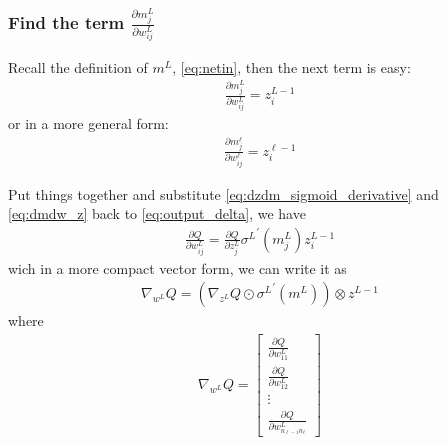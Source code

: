 \documentclass{article} [10pt] %
\begin{document}
\subsubsection{Find the term $\frac{\partial m^L_{j}}{\partial w^L_{ij}}$}
Recall the definition of $m^L$, \eqref{eq:netin}, then the next term is easy:
\begin{align}\label{eq:dmdw_z}
\boxed{
	\frac{\partial m^L_{j}}{\partial w^L_{ij}} = z^{L-1}_i
}
\end{align}
or in a more general form:
\begin{align}\label{eq:dmdw_z}
	\frac{\partial m^\ell_{j}}{\partial w^\ell_{ij}} = z^{\ell-1}_i
\end{align}

Put things together and substitute \eqref{eq:dzdm_sigmoid_derivative}  and \eqref{eq:dmdw_z} back to \eqref{eq:output_delta}, we have
\begin{align}
	\frac{\partial Q}{\partial w^L_{ij}} = \frac{\partial Q}{\partial z^L_{j}}
							{\sigma^L}^\prime(m^L_{j}) 
							z^{L-1}_i
\end{align}
wich in a more compact vector form, we can write it as 
\begin{align}
	\nabla_{w^L} Q = (\nabla_{z^L}Q \odot {\sigma^L}^\prime(m^L)) \otimes z^{L-1}
\end{align}
where
\begin{align}
	\nabla_{w^L} Q = \begin{bmatrix}
		\frac{\partial Q}{\partial w^L_{11}} \\
		\frac{\partial Q}{\partial w^L_{12}} \\
		\vdots\\
		\frac{\partial Q}{\partial w^L_{n_{\ell-1}n_\ell}}
	\end{bmatrix}
\end{align}
\end{document}
